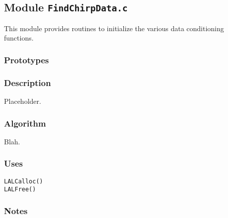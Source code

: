 \subsection{Module \texttt{FindChirpData.c}}
\label{ss:FindChirpData.c}

This module provides routines to initialize the various data conditioning
functions.

\subsubsection*{Prototypes}
\vspace{0.1in}


\subsubsection*{Description}

Placeholder.

\subsubsection*{Algorithm}

Blah.

\subsubsection*{Uses}
\begin{verbatim}
LALCalloc()
LALFree()
\end{verbatim}

\subsubsection*{Notes}
